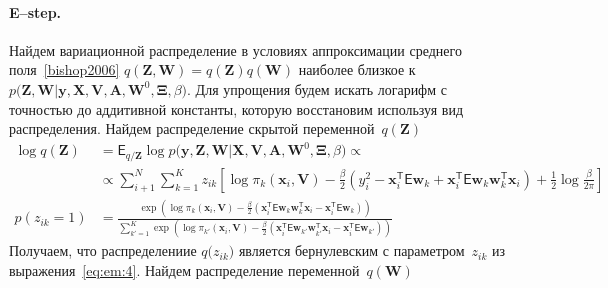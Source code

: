 \documentclass[12pt, twoside]{article}
\numberwithin{equation}{section}
\begin{document}
\paragraph{E--step.} Найдем вариационной распределение в условиях аппроксимации среднего поля~\ref{bishop2006} $q\left(\mathbf{Z}, \mathbf{W}\right) = q\left(\mathbf{Z}\right)q\left(\mathbf{W}\right)$ наиболее близкое к $p\bigr(\mathbf{Z}, \mathbf{W}|\mathbf{y}, \mathbf{X}, \mathbf{V}, \textbf{A}, \textbf{W}^{0}, \bm{\Xi}, \beta\bigr)$. Для упрощения будем искать логарифм с точностью до аддитивной константы, которую восстановим используя вид распределения.
Найдем распределение скрытой переменной~$q\left(\textbf{Z}\right)$
\begin{equation}
\label{eq:em:4}
\begin{aligned}
\log q\left(\textbf{Z}\right) &= \mathsf{E}_{q/\textbf{Z}} \log p\bigr(\mathbf{y}, \mathbf{Z}, \mathbf{W}|\mathbf{X}, \mathbf{V}, \textbf{A}, \textbf{W}^{0}, \bm{\Xi}, \beta\bigr)  \propto\\
&\propto \sum_{i+1}^{N}\sum_{k=1}^{K}z_{ik}\left[\log\pi_{k}\left(\textbf{x}_{i}, \textbf{V}\right) - \frac{\beta}{2}\left(y_{i}^{2} -\textbf{x}_{i}^{\mathsf{T}}\mathsf{E}\textbf{w}_{k} + \textbf{x}_{i}^{\mathsf{T}}\mathsf{E}\textbf{w}_{k}\textbf{w}_{k}^{\mathsf{T}}\textbf{x}_{i}\right) + \frac{1}{2}\log\frac{\beta}{2\pi}\right]\\
p\left(z_{ik} = 1\right) &= \frac{\exp\left(\log\pi_{k}\left(\textbf{x}_{i}, \textbf{V}\right) - \frac{\beta}{2}\left(\textbf{x}_{i}^{\mathsf{T}}\mathsf{E}\textbf{w}_{k}\textbf{w}_{k}^{\mathsf{T}}\textbf{x}_{i} - \textbf{x}_{i}^{\mathsf{T}}\mathsf{E}\textbf{w}_{k}\right)\right)}{\sum_{k'=1}^{K}\exp\left(\log\pi_{k'}\left(\textbf{x}_{i}, \textbf{V}\right) - \frac{\beta}{2}\left(\textbf{x}_{i}^{\mathsf{T}}\mathsf{E}\textbf{w}_{k'}\textbf{w}_{k'}^{\mathsf{T}}\textbf{x}_{i} - \textbf{x}_{i}^{\mathsf{T}}\mathsf{E}\textbf{w}_{k'}\right) \right)}
\end{aligned}
\end{equation}
Получаем, что распределениие $q\bigr(z_{ik}\bigr)$ является бернулевским с параметром~$z_{ik}$ из выражения~\eqref{eq:em:4}.
Найдем распределение переменной~$q\left(\textbf{W}\right)$
\end{document}
